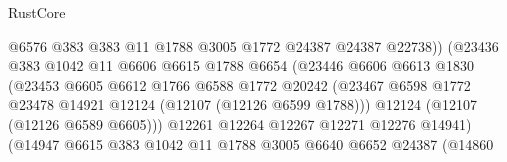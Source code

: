 \begin{lexlean}{RustCore}
\begin{coremodule}
                                        @6576
                                        @383
                                        @383
                                        @11
                                        @1788
                                        @3005
                                        @1772
                                        @24387
                                        @24387
                                        @22738))
                                    (@23436
                                      @383
                                      @1042
                                      @11
                                      @6606
                                      @6615
                                      @1788
                                      @6654
                                      (@23446
                                        @6606
                                        @6613
                                        @1830
                                        (@23453
                                          @6605
                                          @6612
                                          @1766
                                          @6588
                                          @1772
                                          @20242
                                          (@23467
                                            @6598
                                            @1772
                                            @23478
                                            @14921
                                            @12124
                                            (@12107 (@12126 @6599 @1788)))
                                          @12124
                                          (@12107 (@12126 @6589 @6605)))
                                        @12261
                                        @12264
                                        @12267
                                        @12271
                                        @12276
                                        @14941)
                                      (@14947
                                        @6615
                                        @383
                                        @1042
                                        @11
                                        @1788
                                        @3005
                                        @6640
                                        @6652
                                        @24387
                                        (@14860

\end{coremodule}
\end{lexlean}
